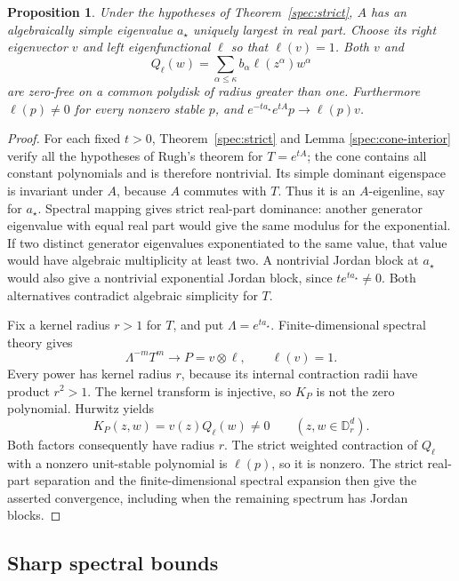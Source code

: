 \documentclass[reqno]{amsart}
\newtheorem{proposition}[theorem]{Proposition}
\theoremstyle{definition}
\theoremstyle{remark}
\newcommand{\D}{\mathbb D}
\begin{document}
\begin{proposition}\label{spec:perron}
Under the hypotheses of Theorem~\ref{spec:strict}, \(A\) has an
algebraically simple eigenvalue \(a_\star\) uniquely largest in real
part.  Choose its right eigenvector \(v\) and left eigenfunctional
\(\ell\) so that \(\ell(v)=1\).  Both \(v\) and
\begin{equation}\label{spec:dual-polynomial}
 Q_\ell(w)=\sum_{\alpha\le\kappa}b_\alpha\ell(z^\alpha)w^\alpha
\end{equation}
are zero-free on a common polydisk of radius greater than one.
Furthermore \(\ell(p)\ne0\) for every nonzero stable \(p\), and
\(e^{-ta_\star}e^{tA}p\to\ell(p)v\).
\end{proposition}
\begin{proof}
For each fixed \(t>0\), Theorem~\ref{spec:strict} and Lemma
\ref{spec:cone-interior} verify all the hypotheses of Rugh's theorem
for \(T=e^{tA}\); the cone contains all constant polynomials
and is therefore nontrivial. Its simple dominant eigenspace is invariant under
\(A\), because \(A\) commutes with \(T\).  Thus it is an
\(A\)-eigenline, say for \(a_\star\).  Spectral mapping gives
strict real-part dominance: another generator eigenvalue with equal
real part would give the same modulus for the exponential.  If two
distinct generator eigenvalues exponentiated to the same value, that
value would have algebraic multiplicity at least two.  A nontrivial
Jordan block at \(a_\star\) would also give a nontrivial exponential
Jordan block, since \(t e^{ta_\star}\ne0\).  Both alternatives
contradict algebraic simplicity for \(T\).

Fix a kernel radius \(r>1\) for \(T\), and put
\(\Lambda=e^{ta_\star}\).  Finite-dimensional spectral theory gives
\[
 \Lambda^{-m}T^m\longrightarrow P=v\otimes\ell,
 \qquad \ell(v)=1.
\]
Every power has kernel radius \(r\), because its internal contraction
radii have product \(r^2>1\).  The kernel transform is injective, so
\(K_P\) is not the zero polynomial.  Hurwitz yields
\[
 K_P(z,w)=v(z)Q_\ell(w)\ne0\qquad(z,w\in\D_r^d).
\]
Both factors consequently have radius \(r\).  The strict weighted
contraction of \(Q_\ell\) with a nonzero unit-stable polynomial is
\(\ell(p)\), so it is nonzero.  The strict real-part separation and
the finite-dimensional spectral expansion then give the asserted
convergence, including when the remaining spectrum has Jordan blocks.
\end{proof}

\subsection{Sharp spectral bounds}
\end{document}
